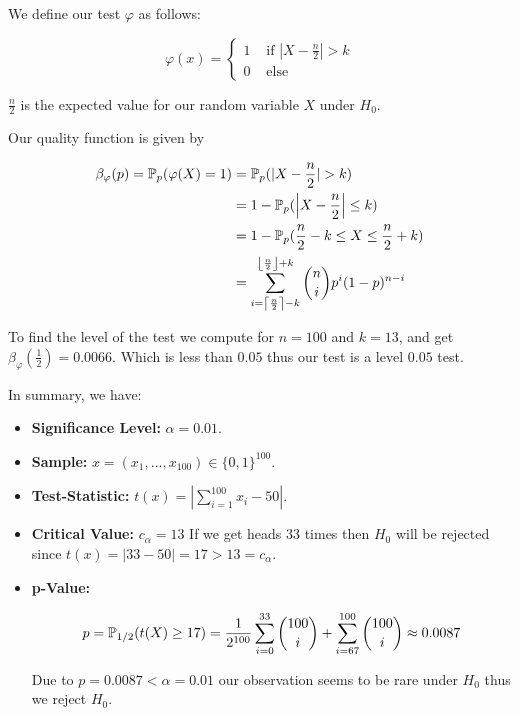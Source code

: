 We define our test \(\varphi\) as follows: 

\[
    \varphi(x) = 
    \begin{cases}
        1 &\text{ if } |X - \frac{n}{2}| > k \\ 
        0 &\text{ else }
    \end{cases}
\]

\(\frac{n}{2}\) is the expected value for our random variable \(X\) under \(H_0\). 

Our quality function is given by 

\begin{align*} 
    \beta_\varphi (p) = \mathbb{P}_p( \varphi(X) = 1) &= \mathbb{P}_p(|X - \frac{n}{2}| > k) \\ 
    &= 1 - \mathbb{P}_p( \left|X - \frac{n}{2} \right| \le k) \\ 
    &= 1 - \mathbb{P}_p(\frac{n}{2} - k \le X \le \frac{n}{2} + k) \\ 
    &= \sum_{i = \left\lceil \frac{n}{2}\right\rceil  - k}^{\left\lfloor \frac{n}{2} \right\rfloor + k} \binom{n}{i} p^i (1 - p)^{n - i}
\end{align*}

To find the level of the test we compute for \(n = 100\) and \(k = 13\), and get 
\(\beta_\varphi\left(\frac{1}{2}\right) = 0.0066\). Which is less than \(0.05\) thus our test is a level \(0.05\) test.

In summary, we have: 

\begin{itemize}

    \item \textbf{Significance Level:} \(\alpha = 0.01\).

    \item \textbf{Sample:} \(x = (x_1, \dots, x_{100}) \in \{0,1\}^{100}\).

    \item \textbf{Test-Statistic:} \(t(x) = \left|\sum_{i = 1}^{100} x_i - 50 \right|\).

    \item \textbf{Critical Value:} \(c_\alpha = 13\)
    If we get heads 33 times then \(H_0\) will be rejected since \(t(x) = |33  - 50| = 17 > 13 = c_\alpha\).

    \item \textbf{p-Value:}
    
    \[
        p = \mathbb{P}_{1/2}(t(X) \ge 17) = \frac{1}{2^{100}} \sum_{i = 0}^{33} \binom{100}{i} + \sum_{i = 67}^{100} \binom{100}{i} \approx 0.0087
    \]

    Due to \(p = 0.0087 < \alpha = 0.01\) our observation seems to be rare under \(H_0\) thus we reject \(H_0\).

\end{itemize}

